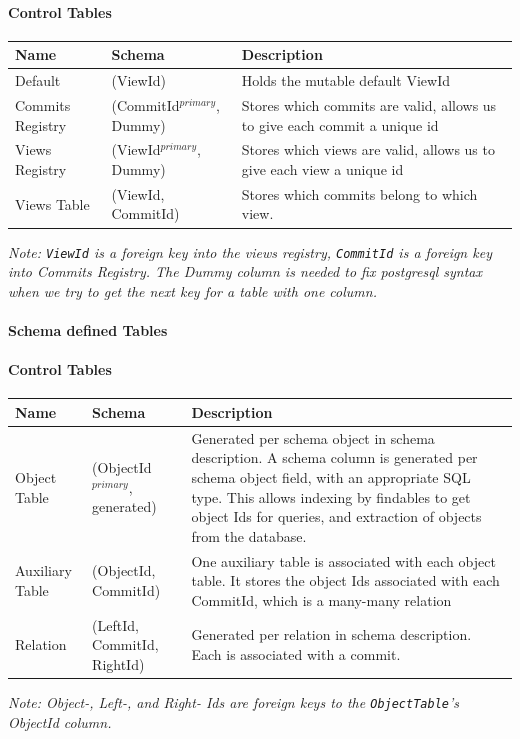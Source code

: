 \documentclass[12pt,a4paper,twoside,openright]{report}
\newcommand\codeName[1]{\texttt{#1}}
\newcommand\note[1]{\textit{#1}}
\begin{document}
		\paragraph{Control Tables}
		\begin{center}
			\begin{tabular}{|p{4cm}||p{4cm}|p{4cm}|} \hline
			Name & Schema & Description \\ \hline
			Default & (ViewId) & Holds the mutable default ViewId \\ \hline
			Commits Registry & (CommitId$^{primary}$, Dummy) & Stores which commits are valid, allows us to give each commit a unique id \\ \hline
			Views Registry & (ViewId$^{primary}$, Dummy) & Stores which views are valid, allows us to give each view a unique id \\ \hline
			Views Table & (ViewId, CommitId) & Stores which commits belong to which view. \\ \hline
			\end{tabular}
		\end{center}
\note{Note: \codeName{ViewId} is a foreign key into the views registry, \codeName{CommitId} is a foreign key into Commits Registry. The Dummy column is needed to fix postgresql syntax when we try to get the next key for a table with one column.}		
		
		\paragraph{Schema defined Tables}
				\paragraph{Control Tables}
		\begin{center}
			\begin{tabular}{|p{4cm}||p{4cm}|p{4cm}|} \hline
			Name & Schema & Description \\ \hline
			Object Table & (ObjectId$^{primary}$, generated) & Generated per schema object in schema description. A schema column is generated per schema object field, with an appropriate SQL type. This allows indexing by findables to get object Ids for queries, and extraction of objects from the database. \\ \hline
			Auxiliary Table & (ObjectId, CommitId) & One auxiliary table is associated with each object table. It stores the object Ids associated with each CommitId, which is a many-many relation \\ \hline
			Relation & (LeftId, CommitId, RightId) & Generated per relation in schema description. Each is associated with a commit.  \\ \hline
			\end{tabular}
		\end{center}
		\note{Note: Object-, Left-, and Right- Ids are foreign keys to the \codeName{ObjectTable}'s ObjectId column.}
\end{document}
